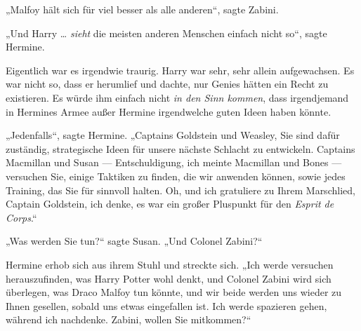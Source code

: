 „Malfoy hält sich für viel besser als alle anderen“, sagte Zabini.

„Und Harry … \emph{sieht} die meisten anderen Menschen einfach nicht so“, sagte Hermine.

Eigentlich war es irgendwie traurig. Harry war sehr, sehr allein aufgewachsen. Es war nicht so, dass er herumlief und dachte, nur Genies hätten ein Recht zu existieren. Es würde ihm einfach nicht \emph{in den Sinn kommen}, dass irgendjemand in Hermines Armee außer Hermine irgendwelche guten Ideen haben könnte.

„Jedenfalls“, sagte Hermine.
„Captains Goldstein und Weasley, Sie sind dafür zuständig, strategische Ideen für unsere nächste Schlacht zu entwickeln. Captains Macmillan und Susan — Entschuldigung, ich meinte Macmillan und Bones — versuchen Sie, einige Taktiken zu finden, die wir anwenden können, sowie jedes Training, das Sie für sinnvoll halten. Oh, und ich gratuliere zu Ihrem Marschlied, Captain Goldstein, ich denke, es war ein großer Pluspunkt für den \emph{Esprit de Corps}.“

„Was werden Sie tun?“ sagte Susan.
„Und Colonel Zabini?“

Hermine erhob sich aus ihrem Stuhl und streckte sich.
„Ich werde versuchen herauszufinden, was Harry Potter wohl denkt, und Colonel Zabini wird sich überlegen, was Draco Malfoy tun könnte, und wir beide werden uns wieder zu Ihnen gesellen, sobald uns etwas eingefallen ist. Ich werde spazieren gehen, während ich nachdenke. Zabini, wollen Sie mitkommen?“

